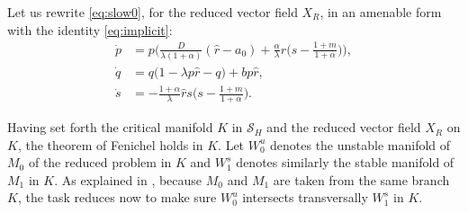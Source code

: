 \documentclass[a4paper,11pt]{article}
\theoremstyle{remark}
\begin{document}
Let us rewrite \eqref{eq:slow0}, for the reduced vector field $X_R$, in an amenable form with the identity \eqref{eq:implicit}:
\begin{equation}\label{eq:slow02}
 \begin{aligned}
 \dot{p} &= p\Big(\frac{D}{\lambda(1+\alpha)}(\hat{r}-a_0) + \frac{\alpha}{\lambda}\hat{r}\big(s- \frac{1+m}{1+\alpha}\big) \Big),\\
 \dot{q} &=q\Big(1 -\lambda p \hat{r} -q\Big) + b p \hat{r},\\%
 \dot{s} &= -\frac{1+\alpha}{\lambda}\hat{r}s\Big(s- \frac{1+m}{1+\alpha}\Big).
 \end{aligned}
\end{equation}

Having set forth the critical manifold $K$ in $\mathcal{S}_H$ and the reduced vector field $X_R$ on $K$, the theorem of Fenichel holds in $K$. %
Let $W_0^u$ denotes the unstable manifold of $M_0$ of the reduced problem in $K$ and $W_1^s$ denotes similarly the stable manifold of $M_1$ in $K$. As explained in \cite{Sz1991}, because $M_0$ and $M_1$ are taken from the same branch $K$, the task reduces now to make sure $W_0^u$ intersects transversally $W_1^s$ in $K$.
\end{document}
